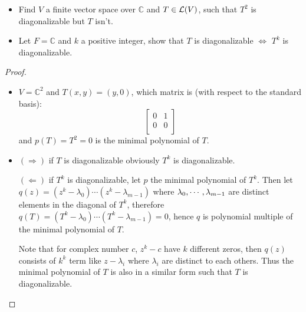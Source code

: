 \documentclass[../main.tex]{subfiles}
\begin{document}
\begin{exercise}
  \begin{itemize}
    \item Find $V$ a finite vector space over $\mathbb{C}$ and $T \in \mathcal{L}(V)$, such that $T^2$ is diagonalizable but $T$ isn't.
    \item Let $F = \mathbb{C}$ and $k$ a positive integer, show that $T$ is diagonalizable $\iff$ $T^k$ is diagonalizable.
  \end{itemize}
\end{exercise}
\begin{proof}
  ~
  \begin{itemize}
    \item $V = \mathbb{C}^2$ and $T(x, y) = (y, 0)$, which matrix is (with respect to the standard basis):
          \[
          \begin{bmatrix}
            0 & 1 \\
            0 & 0 \\
          \end{bmatrix}
          \]
          and $p(T) = T^2 = 0$ is the minimal polynomial of $T$.
    \item $(\Rightarrow)$ if $T$ is diagonalizable obviously $T^k$ is diagonalizable.
          
          $(\Leftarrow)$ if $T^k$ is diagonalizable, let $p$ the minimal polynomial of $T^k$.
          Then let $q(z) = (z^k - \lambda_0) \cdots (z^k - \lambda_{m - 1})$
          where $\lambda_0 , \cdots , \lambda_{m - 1}$ are distinct elements in the diagonal of $T^k$,
          therefore $q(T) = (T^k - \lambda_0) \cdots (T^k - \lambda_{m - 1}) = 0$,
          hence $q$ is polynomial multiple of the minimal polynomial of $T$.

          Note that for complex number $c$, $z^k - c$ have $k$ different zeros,
          then $q(z)$ consists of $k^k$ term like $z - \lambda_i$ where $\lambda_i$
          are distinct to each others. Thus
          the minimal polynomial of $T$ is also in a similar form
          such that $T$ is diagonalizable.
  \end{itemize}
\end{proof}
\end{document}
